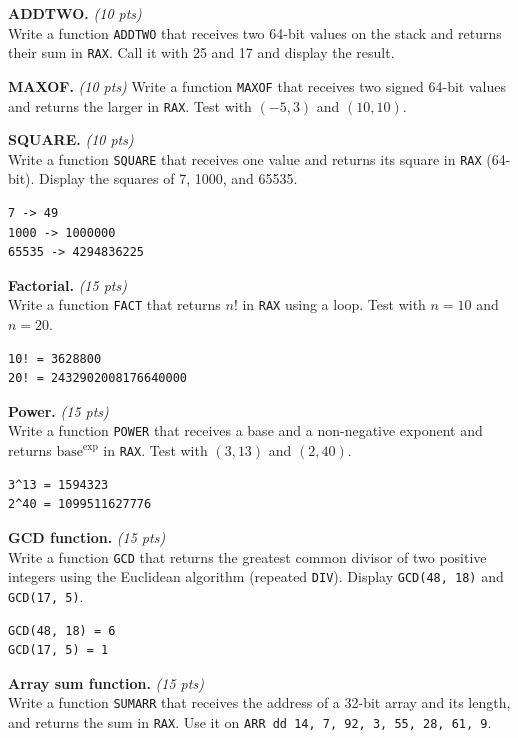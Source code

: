 \documentclass[11pt,letterpaper]{article}
\newcommand{\pts}[1]{\hfill\textit{(#1 pts)}}
\newcommand{\ttl}[1]{\textbf{#1.}}
\begin{document}
\begin{problems}

\item \ttl{ADDTWO} \pts{10}
\\Write a function \texttt{ADDTWO} that receives two 64-bit values on the stack and returns their sum in \texttt{RAX}. Call it with 25 and 17 and display the result.

\item \ttl{MAXOF} \pts{10}
Write a function \texttt{MAXOF} that receives two signed 64-bit values and returns the larger in \texttt{RAX}. Test with $(-5, 3)$ and $(10, 10)$.

\item \ttl{SQUARE} \pts{10}
\\Write a function \texttt{SQUARE} that receives one value and returns its square in \texttt{RAX} (64-bit). Display the squares of 7, 1000, and 65535.
\begin{lstlisting}[style=out]
7 -> 49
1000 -> 1000000
65535 -> 4294836225
\end{lstlisting}

\item \ttl{Factorial} \pts{15}
\\Write a function \texttt{FACT} that returns $n!$ in \texttt{RAX} using a loop. Test with $n = 10$ and $n = 20$.
\begin{lstlisting}[style=out]
10! = 3628800
20! = 2432902008176640000
\end{lstlisting}

\item \ttl{Power} \pts{15}
\\Write a function \texttt{POWER} that receives a base and a non-negative exponent and returns $\text{base}^{\text{exp}}$ in \texttt{RAX}. Test with $(3, 13)$ and $(2, 40)$.
\begin{lstlisting}[style=out]
3^13 = 1594323
2^40 = 1099511627776
\end{lstlisting}

\item \ttl{GCD function} \pts{15}
\\Write a function \texttt{GCD} that returns the greatest common divisor of two positive integers using the Euclidean algorithm (repeated \texttt{DIV}). Display \texttt{GCD(48, 18)} and \texttt{GCD(17, 5)}.
\begin{lstlisting}[style=out]
GCD(48, 18) = 6
GCD(17, 5) = 1
\end{lstlisting}

\item \ttl{Array sum function} \pts{15}
\\Write a function \texttt{SUMARR} that receives the address of a 32-bit array and its length, and returns the sum in \texttt{RAX}. Use it on \texttt{ARR dd 14, 7, 92, 3, 55, 28, 61, 9}.

\end{problems}
\end{document}
